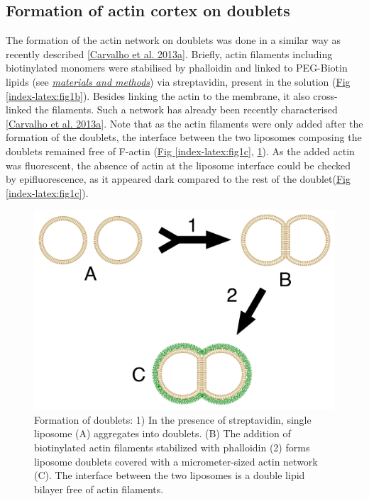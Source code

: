 \documentclass[A4paperpaper,11pt,english]{sphinxmanual}
\begin{document}
\subsection{Formation of actin cortex on doublets}
\label{index-latex:formation-of-actin-cortex-on-doublets}
The formation of the actin network on doublets was done in a similar way as recently described
{\hyperref[index-latex:carvalho2013a]{{[}Carvalho et al. 2013a{]}}}.  Briefly, actin filaments including
biotinylated monomers were stabilised by phalloidin and linked to PEG-Biotin
lipids (see {\hyperref[index-latex:m-et-m]{\emph{materials and methods}}})  via streptavidin,
present in the solution (\hyperref[index-latex:fig1b]{Fig  \ref*{index-latex:fig1b}}).  Besides linking the actin to the
membrane, it also cross-linked the filaments.  Such a network has already been
recently characterised {\hyperref[index-latex:carvalho2013a]{{[}Carvalho et al. 2013a{]}}}.  Note that as the actin filaments
were only added after the formation of the doublets, the interface between the
two liposomes composing the doublets remained free of F-actin (\hyperref[index-latex:fig1c]{Fig  \ref*{index-latex:fig1c}}, \hyperref[index-latex:fds]{ \ref*{index-latex:fds}}). As the added actin was fluorescent, the absence of actin
at the liposome interface could be checked by epifluorescence, as it appeared dark
compared to the rest of the doublet(\hyperref[index-latex:fig1c]{Fig  \ref*{index-latex:fig1c}}).
\begin{figure}[htbp]
\centering
\capstart

\includegraphics[width=0.700\linewidth]{doublets-schema.png}
\caption{Formation of doublets: 1) In the presence of streptavidin, single liposome
(A) aggregates into doublets. (B) The addition of biotinylated actin
filaments stabilized with phalloidin (2) forms liposome doublets covered
with a micrometer-sized actin network (C). The interface between the two
liposomes is a double lipid bilayer free of actin filaments.}\label{index-latex:fds}\end{figure}
\end{document}

